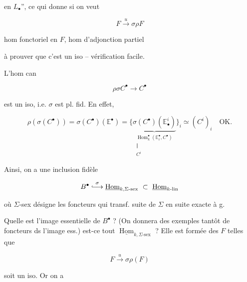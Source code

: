 en $L_{\bullet}$'', ce qui donne si on veut

\[
 F\xrightarrow{u}\sigma\rho F
\]

hom fonctoriel en $F$,    hom d'adjonction partiel


à prouver que c'est un iso -- vérification facile.

L'hom can

\[
 \rho\sigma C^{\bullet}\longrightarrow C^{\bullet}
\]

est un iso, i.e. $\sigma$ est pl. fid. En effet,

\[
 \rho(\sigma(C^{\bullet}))=\sigma(C^{\bullet})(\mathbb E^{\bullet})=
 \bigl\{\underbrace{\sigma(C^{\bullet})(\mathbb E_{\bullet}^{i})}_{\substack{\operatorname{Hom}_{k}^{\bullet}(\mathbb E_i^{\bullet},C^{\bullet})\\ \Vert\\ C^{i}}}\bigr\}_{i}
 \simeq(C^{i})_{i}\quad\text{OK.}
\]

Ainsi, on a une inclusion  fidèle

\[
 B^{\bullet}\overset{\sigma}{\lhook\joinrel\longrightarrow}\underline{\operatorname{Hom}}_{k,\Sigma\text{-}\mathrm{sex}}\ \subset\ \underline{\operatorname{Hom}}_{k\text{-}\mathrm{lin}}
\]

où $\Sigma$-sex désigne les foncteurs qui transf. suite de $\Sigma$ en suite exacte à g.

Quelle est l'image essentielle de $B^{\bullet}$ ? (On donnera des exemples tantôt de foncteurs ds l'image ess.) est-ce tout $\underline{\operatorname{Hom}}_{k,\Sigma\text{-}\mathrm{sex}}$ ? Elle est formée des $F$ telles que

\[
 F\xrightarrow{u}\sigma\rho(F)
\]

soit un iso. Or on a


